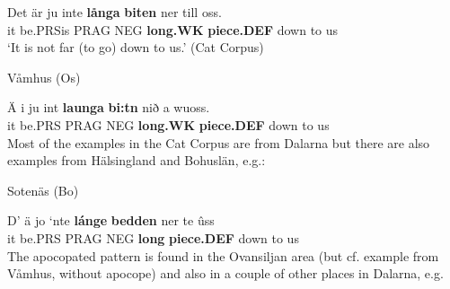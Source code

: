 
 \ea\label{}
\gll Det  är  ju  inte  \textbf{långa}\textbf{  biten} ner  till  oss.\\


it  be.PRSis  PRAG  NEG  \textbf{long.WK} \textbf{piece.DEF} down  to  us\\

\glt ‘It is not far (to go) down to us.’ (Cat Corpus)

\z

\item 

Våmhus (Os) 



 \ea\label{}
\gll Ä  i  ju  int  \textbf{launga} \textbf{bi:tn} nið  a  wuoss.\\


it  be.PRS  PRAG  NEG  \textbf{long.WK} \textbf{piece.DEF} down  to  us\\

Most of the examples in the Cat Corpus are from Dalarna but there are also examples from Hälsingland and Bohuslän, e.g.:


\item 

Sotenäs (Bo)



 \ea\label{}
\gll D’  ä  jo  ‘nte  \textbf{lánge} \textbf{bedden} ner  te  ûss\\


it  be.PRS  PRAG  NEG  \textbf{long} \textbf{piece.DEF} down  to  us\\

The apocopated pattern is found in the Ovansiljan area (but cf. example from Våmhus, without apocope) and also in a couple of other places in Dalarna, e.g.

